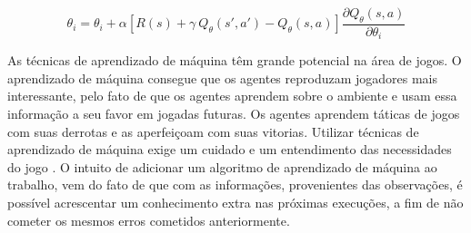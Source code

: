 \begin{equation}
\label{eq:gene}	
\theta_{i} = \theta_{i} + \alpha [R(s) + \gamma~Q_{\theta}(s', a') - Q_{\theta}(s, a)] \frac{\partial Q_{\theta}(s, a)}{\partial \theta_{i}}
\end{equation}

As técnicas de aprendizado de máquina têm grande potencial na área de jogos. O aprendizado de máquina consegue que os agentes reproduzam jogadores mais interessante, pelo fato de que os agentes aprendem sobre o ambiente e usam essa informação a seu favor em jogadas futuras. Os agentes aprendem táticas de jogos com suas derrotas e as aperfeiçoam com suas vitorias. Utilizar técnicas de aprendizado de máquina exige um cuidado e um entendimento das necessidades do jogo \cite{millington2009artificial}. O intuito de adicionar um algoritmo de aprendizado de máquina ao trabalho, vem do fato de que com as informações, provenientes das observações, é possível acrescentar um conhecimento extra nas próximas execuções, a fim de não cometer os mesmos erros cometidos anteriormente. 

